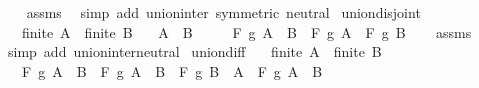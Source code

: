 \begin{isabellebody}
%
\isadelimproof
\ \ %
\endisadelimproof
%
\isatagproof
{}\isamarkupfalse%
\ assms\ \isamarkupfalse%
\ {\isacharparenleft}{\kern0pt}simp\ add{\isacharcolon}{\kern0pt}\ union{\isacharunderscore}{\kern0pt}inter\ {\isacharbrackleft}{\kern0pt}symmetric{\isacharbrackright}{\kern0pt}\ neutral{\isacharparenright}{\kern0pt}%
\endisatagproof
{\isafoldproof}%
%
\isadelimproof
\isanewline
%
\endisadelimproof
\isanewline
{}\isamarkupfalse%
\ union{\isacharunderscore}{\kern0pt}disjoint{\isacharcolon}{\kern0pt}\isanewline
\ \ \ {\isachardoublequoteopen}finite\ A{\isachardoublequoteclose}\ \ {\isachardoublequoteopen}finite\ B{\isachardoublequoteclose}\isanewline
\ \ \ {\isachardoublequoteopen}A\ {\isasyminter}\ B\ {\isacharequal}{\kern0pt}\ {\isacharbraceleft}{\kern0pt}{\isacharbraceright}{\kern0pt}{\isachardoublequoteclose}\isanewline
\ \ \ {\isachardoublequoteopen}F\ g\ {\isacharparenleft}{\kern0pt}A\ {\isasymunion}\ B{\isacharparenright}{\kern0pt}\ {\isacharequal}{\kern0pt}\ F\ g\ A\ \isactrlbold {\isacharasterisk}{\kern0pt}\ F\ g\ B{\isachardoublequoteclose}\isanewline
%
\isadelimproof
\ \ %
\endisadelimproof
%
\isatagproof
{}\isamarkupfalse%
\ assms\ \isamarkupfalse%
\ {\isacharparenleft}{\kern0pt}simp\ add{\isacharcolon}{\kern0pt}\ union{\isacharunderscore}{\kern0pt}inter{\isacharunderscore}{\kern0pt}neutral{\isacharparenright}{\kern0pt}%
\endisatagproof
{\isafoldproof}%
%
\isadelimproof
\isanewline
%
\endisadelimproof
\isanewline
{}\isamarkupfalse%
\ union{\isacharunderscore}{\kern0pt}diff{}{\isacharcolon}{\kern0pt}\isanewline
\ \ \ {\isachardoublequoteopen}finite\ A{\isachardoublequoteclose}\ \ {\isachardoublequoteopen}finite\ B{\isachardoublequoteclose}\isanewline
\ \ \ {\isachardoublequoteopen}F\ g\ {\isacharparenleft}{\kern0pt}A\ {\isasymunion}\ B{\isacharparenright}{\kern0pt}\ {\isacharequal}{\kern0pt}\ F\ g\ {\isacharparenleft}{\kern0pt}A\ {\isacharminus}{\kern0pt}\ B{\isacharparenright}{\kern0pt}\ \isactrlbold {\isacharasterisk}{\kern0pt}\ F\ g\ {\isacharparenleft}{\kern0pt}B\ {\isacharminus}{\kern0pt}\ A{\isacharparenright}{\kern0pt}\ \isactrlbold {\isacharasterisk}{\kern0pt}\ F\ g\ {\isacharparenleft}{\kern0pt}A\ {\isasyminter}\ B{\isacharparenright}{\kern0pt}{\isachardoublequoteclose}\isanewline
%
\isadelimproof
%
\endisadelimproof
%
\isatagproof
{}\isamarkupfalse%
\ {\isacharminus}{\kern0pt}\isanewline

\end{isabellebody}
